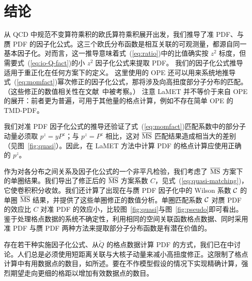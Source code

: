 \section{结论}
\label{sec:summary}

从 QCD 中规范不变算符乘积的欧氏算符乘积展开出发，我们推导了准 PDF、\spcorr 与赝 PDF 的因子化公式。这三个欧氏分布函数是相互关联的可观测量，都源自同一基本因子化。对\spcorr 而言，这一推导意味着式~(\ref{eq:ratio})中的比值确实按 $z^2$ 标度，但需要式~(\ref{eq:io-Q-fact})的小 $z^2$ 因子化公式来提取 PDF。
%
我们的因子化公式推导适用于重正化\spcorr 在任何方案下的定义。
这里使用的 OPE 还可以用来系统地推导式~(\ref{eq:momfact})幂次修正的因子化公式，那将涉及向高扭度部分子分布的匹配。（这些修正的数值相关性在文献~\cite{Chen:2016utp}中被考察。）
%
注意 LaMET 并不等价于来自 OPE 的展开：前者更为普遍，可用于其他量的格点计算，例如不存在简单 OPE 的 TMD-PDF。

我们对准 PDF 因子化公式的推导还验证了式~(\ref{eq:momfact})匹配系数中的部分子动量必须取 $p^z=yP^z$；与 $p^z=P^z$ 相比，这对 $\overline{\rm MS}$ 匹配结果造成相当大的差别（见图~\ref{fig:quasi}）。因此，在 LaMET 方法中计算 PDF 的格点计算应使用正确的 $p^z$。

作为对各分布之间关系及因子化公式的一个非平凡检验，我们考虑了 $\overline{\rm MS}$ 方案下的单圈结果。我们导出了修正后的 $\overline{\rm MS}$ 方案系数 $C$，见式~(\ref{eq:quasi-matching})，它使卷积积分收敛。我们还计算了出现在\spcorr 与赝 PDF 因子化中的 Wilson 系数 ${\cal C}$ 的单圈 $\overline{\rm MS}$ 结果，并提供了这些单圈修正的数值分析。单圈匹配系数 ${\cal C}$ 对赝 PDF 的效应比 $C$ 对准 PDF 的效应小，比较图~\ref{fig:quasi}与图~\ref{fig:pseudo}即可看出。鉴于处理格点数据的系统不确定性，利用相同的空间关联函数格点数据、同时采用准 PDF 与赝 PDF 两种方法来提取部分子分布函数是有潜在价值的。

存在若干种实施因子化公式、从\spcorr $\tilde Q$ 的格点数据计算 PDF 的方式，我们已在中讨论。人们总是必须使用短距离关联与大核子动量来减小高扭度修正。这限制了格点计算中有用数据点的数目，如所述。要在不作模型假设的情况下实现精确计算，强烈期望走向更细的格距以增加有效数据点的数目。
